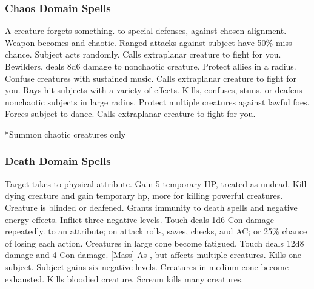 \subsubsection{Chaos Domain Spells}

\begin{spelllist}
     A creature forgets something.
      to special defenses,  against chosen alignment.
     Weapon becomes  and chaotic.
     Ranged attacks against subject have 50\% miss chance.
     Subject acts randomly.
     Calls extraplanar creature to fight for you.
     Bewilders, deals 8d6 damage to nonchaotic creature.
     Protect allies in a \areamed radius.
     Confuse creatures with sustained music.
     Calls extraplanar creature to fight for you.
     Rays hit subjects with a variety of effects.
     Kills, confuses, stuns, or deafens nonchaotic subjects in large radius.
    \F Protect multiple creatures against lawful foes. 
    \spellhead[8]{}
     Forces subject to dance.
     Calls extraplanar creature to fight for you.
\end{spelllist}
*Summon chaotic creatures only

\subsubsection{Death Domain Spells}

\begin{spelllist}
     Target takes  to physical attribute.
     Gain 5 temporary HP, treated as undead.
     Kill dying creature and gain temporary hp, more for killing powerful creatures.
     Creature is blinded or deafened.
     Grants immunity to death spells and negative energy effects.
    \spellhead[3]{}
     Inflict three negative levels.
     Touch deals 1d6 Con damage repeatedly.
      to an attribute;  on attack rolls, saves, checks, and AC; or 25\% chance of losing each action.
     Creatures in large cone become fatigued.
    \spellhead[6]{}
     Touch deals 12d8 damage and 4 Con damage.
    [Mass] As , but affects multiple creatures.
     Kills one subject.
     Subject gains six negative levels.
     Creatures in medium cone become exhausted.
     Kills bloodied creature.
     Scream kills many creatures. 
\end{spelllist}

